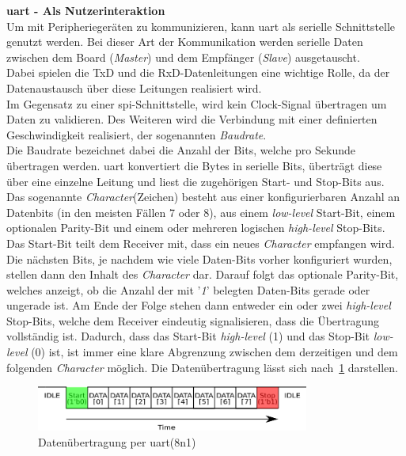 \textbf{\acl{uart} - Als Nutzerinteraktion}\\
Um mit Peripheriegeräten zu kommunizieren, kann \ac{uart} als serielle Schnittstelle genutzt werden.
Bei dieser Art der Kommunikation werden serielle Daten zwischen dem Board (\emph{Master})
und dem Empfänger (\emph{Slave}) ausgetauscht. \\
Dabei spielen die TxD und die RxD-Datenleitungen
eine wichtige Rolle, da der Datenaustausch über diese Leitungen realisiert wird.\\
Im Gegensatz zu einer \ac{spi}-Schnittstelle, wird kein Clock-Signal
übertragen um Daten zu validieren. Des Weiteren wird die Verbindung mit einer definierten
Geschwindigkeit realisiert, der sogenannten \emph{Baudrate}.~\cite{uartpdf} \\
Die Baudrate bezeichnet dabei die Anzahl der Bits, welche pro Sekunde übertragen werden.
\ac{uart} konvertiert die Bytes in serielle Bits, überträgt diese über eine einzelne Leitung
und liest die zugehörigen Start- und Stop-Bits aus.\\
Das sogenannte \emph{Character}(Zeichen) besteht aus einer konfigurierbaren Anzahl an Datenbits (in den meisten
Fällen 7 oder 8), aus einem \emph{low-level} Start-Bit, einem optionalen Parity-Bit und einem
oder mehreren logischen \emph{high-level} Stop-Bits.\\
Das Start-Bit teilt dem Receiver mit, dass ein neues \emph{Character} empfangen wird.
Die nächsten Bits, je nachdem wie viele Daten-Bits vorher konfiguriert wurden, stellen
dann den Inhalt des \emph{Character} dar. Darauf folgt das optionale Parity-Bit,
welches anzeigt, ob die Anzahl der mit '\emph{1}' belegten Daten-Bits gerade oder
ungerade ist. Am Ende der Folge stehen dann entweder ein oder zwei  \emph{high-level } Stop-Bits,
welche dem Receiver eindeutig signalisieren, dass die Übertragung vollständig ist. Dadurch,
dass das Start-Bit \emph{high-level} (1) und das Stop-Bit \emph{low-level} (0) ist,
ist immer eine klare Abgrenzung zwischen dem derzeitigen und dem folgenden \emph{Character} möglich.
\newpage
Die Datenübertragung lässt sich nach~\ref{fig:uart} darstellen.\\

\begin{figure}[H]
\centering
\includegraphics[width=0.8\textwidth]{Hauptteil/uart.eps}
\caption{Datenübertragung per \ac{uart}(8n1) }
\label{fig:uart}
\end{figure}


